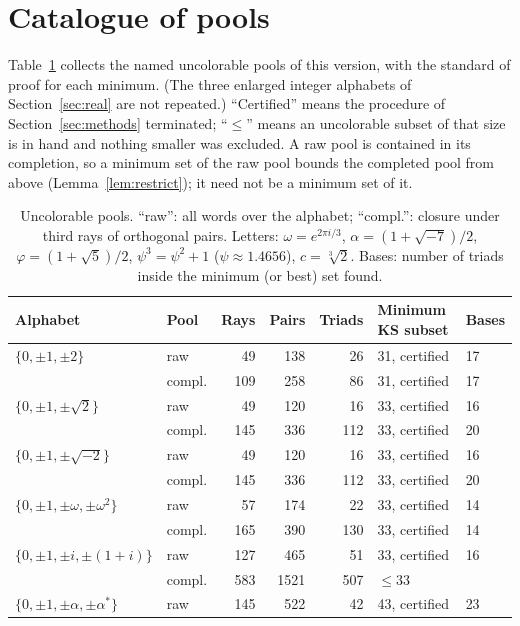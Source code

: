 \section{Catalogue of pools}\label{sec:catalogue}

Table~\ref{tab:catalogue} collects the named uncolorable pools of this version, with the
standard of proof for each minimum.  (The three enlarged integer alphabets of
Section~\ref{sec:real} are not repeated.)  ``Certified'' means the procedure of
Section~\ref{sec:methods} terminated; ``$\le$'' means an uncolorable subset of that size is in
hand and nothing smaller was excluded.  A raw pool is contained in its completion, so a minimum
set of the raw pool bounds the completed pool from above (Lemma~\ref{lem:restrict}); it need not
be a minimum set of it.

\begin{table}[t]
\centering
\caption{Uncolorable pools.  ``raw'': all words over the alphabet; ``compl.'': closure under
third rays of orthogonal pairs.  Letters: $\omega=e^{2\pi i/3}$, $\alpha=(1+\sqrt{-7})/2$,
$\varphi=(1+\sqrt5)/2$, $\psi^3=\psi^2+1$ ($\psi\approx1.4656$), $c=\sqrt[3]{2}$.  Bases: number
of triads inside the minimum (or best) set found.}
\label{tab:catalogue}
\small
\begin{tabular}{llrrrll}
\toprule
Alphabet & Pool & Rays & Pairs & Triads & Minimum KS subset & Bases \\
\midrule
$\{0,\pm1,\pm2\}$ & raw & 49 & 138 & 26 & 31, certified & 17 \\
 & compl. & 109 & 258 & 86 & 31, certified & 17 \\
$\{0,\pm1,\pm\sqrt2\}$ & raw & 49 & 120 & 16 & 33, certified & 16 \\
 & compl. & 145 & 336 & 112 & 33, certified & 20 \\
$\{0,\pm1,\pm\sqrt{-2}\}$ & raw & 49 & 120 & 16 & 33, certified & 16 \\
 & compl. & 145 & 336 & 112 & 33, certified & 20 \\
$\{0,\pm1,\pm\omega,\pm\omega^2\}$ & raw & 57 & 174 & 22 & 33, certified & 14 \\
 & compl. & 165 & 390 & 130 & 33, certified & 14 \\
$\{0,\pm1,\pm i,\pm(1+i)\}$ & raw & 127 & 465 & 51 & 33, certified & 16 \\
 & compl. & 583 & 1521 & 507 & $\le33$ & \\
$\{0,\pm1,\pm\alpha,\pm\alpha^{*}\}$ & raw & 145 & 522 & 42 & 43, certified & 23 \\

\end{tabular}
\end{table}

